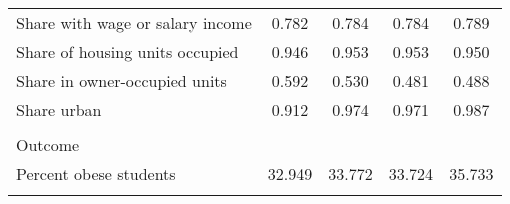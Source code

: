 \begin{center}
\begin{tabular}{lcccc}
Share with wage or salary income & 0.782 & 0.784 & 0.784 & 0.789\\
Share of housing units occupied & 0.946 & 0.953 & 0.953 & 0.950\\
Share in owner-occupied units & 0.592 & 0.530 & 0.481 & 0.488\\
Share urban & 0.912 & 0.974 & 0.971 & 0.987\\
 &  &  &  & \\
Outcome &  &  &  & \\
Percent obese students  & 32.949 & 33.772 & 33.724 & 35.733\\
\noalign{\smallskip}\hline\end{tabular}\\
\end{center}
